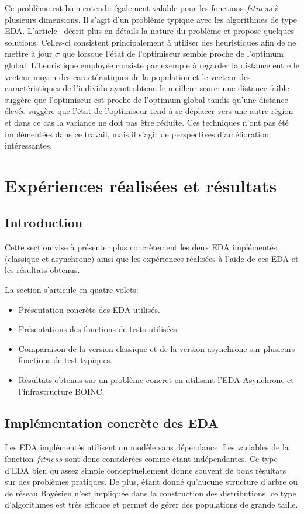 \documentclass[a4paper, 11pt]{report}
\begin{document}
Ce problème est bien entendu également valable pour les fonctions $fitness$ à plusieurs dimensions. Il s'agit d'un problème typique avec les algorithmes de type EDA. L'article~\cite{DIVERSITE} décrit plus en détails la nature du problème et propose quelques solutions. Celles-ci consistent principalement à utiliser des heuristiques afin de ne mettre à jour $\sigma$ que lorsque l'état de l'optimiseur semble proche de l'optimum global. L'heuristique employée consiste par exemple à regarder la distance entre le vecteur moyen des caractéristiques de la population et le vecteur des caractéristiques de l'individu ayant obtenu le meilleur score: une distance faible suggère que l'optimiseur est proche de l'optimum global tandis qu'une distance élevée suggère que l'état de l'optimiseur tend à se déplacer vers une autre région et dans ce cas la variance ne doit pas être réduite. Ces techniques n'ont pas été implémentées dans ce travail, mais il s'agit de perspectives d'amélioration intéressantes.

\section{Expériences réalisées et résultats}
\subsection{Introduction}
Cette section vise à présenter plus concrètement les deux EDA implémentés (classique et asynchrone) ainsi que les expériences réalisées à l'aide de ces EDA et les résultats obtenus. %

La section s'articule en quatre volets:
\begin{itemize}
\item Présentation concrète des EDA utilisés.
\item Présentations des fonctions de tests utilisées.
\item Comparaison de la version classique et de la version asynchrone sur plusieurs fonctions de test typiques.
\item Résultats obtenus sur un problème concret en utilisant l'EDA Asynchrone et l'infrastructure BOINC.
\end{itemize}

\subsection{Implémentation concrète des EDA}
Les EDA implémentés utilisent un modèle sans dépendance. Les variables de la fonction $fitness$ sont donc considérées comme étant indépendantes. Ce type d'EDA bien qu'assez simple conceptuellement donne souvent de bons résultats sur des problèmes pratiques. De plus, étant donné qu'aucune structure d'arbre ou de réseau Bayésien n'est impliquée dans la construction des distributions, ce type d'algorithmes est très efficace et permet de gérer des populations de grande taille.
\end{document}
